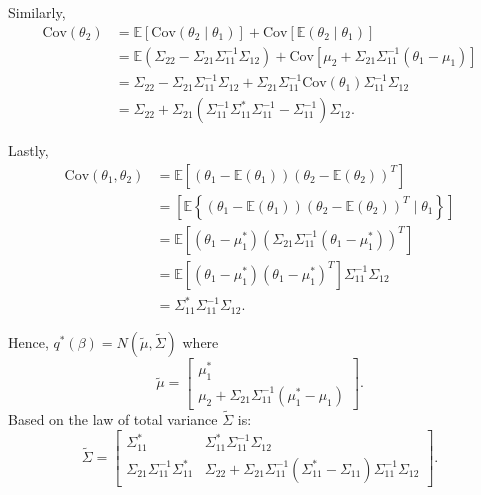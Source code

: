 \noindent Similarly,
$$
\begin{array}{rl}
	\mbox{Cov}(\theta_2) 
	&  = \mathbb{E}[\mbox{Cov}(\theta_2\mid\theta_1)] + \mbox{Cov}[\mathbb{E}(\theta_2\mid\theta_1)] 
	\\ [2ex]
	&  = \mathbb{E}(\Sigma_{22} - \Sigma_{21} \Sigma_{11}^{-1}\Sigma_{12}) + \mbox{Cov}[\mu_2 + \Sigma_{21}\Sigma_{11}^{-1}\left(\theta_1 - \mu_1\right)] 
	\\ [2ex]
	&  = \Sigma_{22} - \Sigma_{21} \Sigma_{11}^{-1}\Sigma_{12}
	+ \Sigma_{21}\Sigma_{11}^{-1}  \mbox{Cov}(\theta_1) \Sigma_{11}^{-1}  \Sigma_{12}
	\\ [2ex]
	&  =  \Sigma_{22} 
	+ \Sigma_{21}(\Sigma_{11}^{-1}  \Sigma_{11}^* \Sigma_{11}^{-1} -\Sigma_{11}^{-1})  \Sigma_{12}.
\end{array} 
$$

\noindent Lastly,
$$
\begin{array}{rl}
	\mbox{Cov}(\theta_1,\theta_2) 
	&  = \mathbb{E}[(\theta_1 - \mathbb{E}(\theta_1))(\theta_2 - \mathbb{E}(\theta_2))^T] 
	\\ [2ex]
	&  = \left[ \mathbb{E}\left\{ (\theta_1 - \mathbb{E}(\theta_1))(\theta_2 - \mathbb{E}(\theta_2))^T \mid \theta_1 \right\} \right]     \\ [2ex]
	& = \mathbb{E}\left[ \left(\theta_1 - \mu_1^* \right)\left(  \Sigma_{21}\Sigma_{11}^{-1}(\theta_1 - \mu_1^*)    \right)^T\right] 
	\\ [2ex]
	&  = \mathbb{E}\left[ \left(\theta_1 - \mu_1^* \right)\left(  \theta_1 - \mu_1^* \right)^T\right] \Sigma_{11}^{-1}\Sigma_{12}
	\\ [2ex]
	&  = \Sigma_{11}^* \Sigma_{11}^{-1}\Sigma_{12}.
\end{array} 
$$

\noindent Hence, $q^*(\beta) = N(\widetilde{\mu},\widetilde{\Sigma})$ where
$$
\widetilde{\mu} =
\left[ \begin{array}{c}
	\mu_1^* \\
	\mu_2 + \Sigma_{21}\Sigma_{11}^{-1}\left(\mu_1^* - \mu_1\right)
\end{array} \right].
$$
Based on the law of total variance $\tilde{\Sigma}$  is:
$$
\widetilde{\Sigma} = 
\left[ \begin{array}{cc}
	\Sigma_{11}^* & \Sigma_{11}^* \Sigma_{11}^{-1}\Sigma_{12} \\
	\Sigma_{21}  \Sigma_{11}^{-1}\Sigma_{11}^* & \Sigma_{22} 
	+ \Sigma_{21}\Sigma_{11}^{-1}  ( \Sigma_{11}^* -\Sigma_{11})  \Sigma_{11}^{-1} \Sigma_{12}
\end{array} \right].
$$




